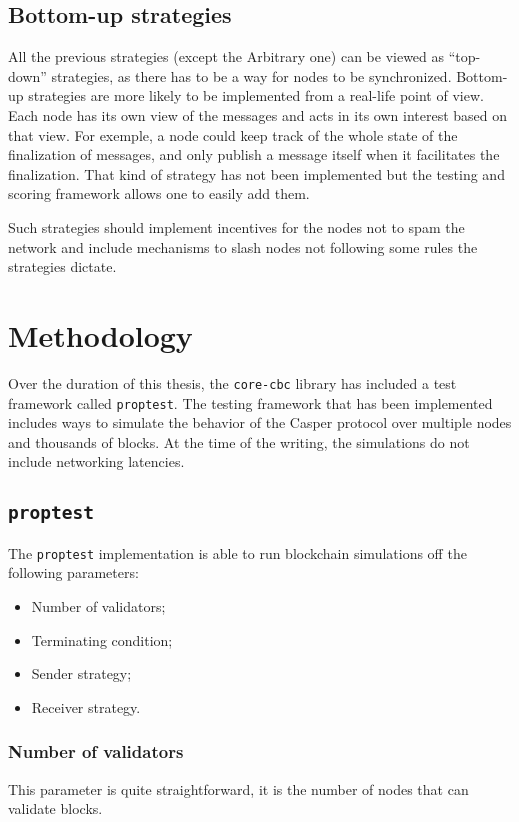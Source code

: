 \subsection{Bottom-up strategies}
\label{ssec:bottomUpStrats}
All the previous strategies (except the Arbitrary one) can be viewed as
``top-down'' strategies, as there has to be a way for nodes to be synchronized.
Bottom-up strategies are more likely to be implemented from a real-life point of
view. Each node has its own view of the messages and acts in its own interest
based on that view.
For exemple, a node could keep track of the whole state of the finalization of
messages, and only publish a message itself when it facilitates the
finalization. That kind of strategy has not been implemented but the testing and
scoring framework allows one to easily add them.

Such strategies should implement incentives for the nodes not to spam the
network and include mechanisms to slash nodes not following some rules the
strategies dictate.

\section{Methodology}
Over the duration of this thesis, the \texttt{core-cbc} library has included a
test framework called \texttt{proptest}. The testing framework that has been
implemented includes ways to simulate the behavior of the Casper protocol over
multiple nodes and thousands of blocks. At the time of the
writing, the simulations do not include networking latencies.

\subsection{\texttt{proptest}}
The \texttt{proptest} implementation is able to run blockchain simulations off
the following parameters:
\begin{itemize}
    \item Number of validators;
    \item Terminating condition;
    \item Sender strategy;
    \item Receiver strategy.
\end{itemize}

\subsubsection{Number of validators}
This parameter is quite straightforward, it is the number of nodes that can
validate blocks.

